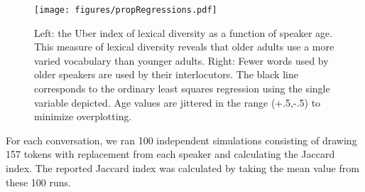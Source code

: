\documentclass[10pt,letterpaper]{article}
\begin{document}
\begin{figure}[t]
\centering
\texttt{[image: figures/propRegressions.pdf]}
\caption{Left: the Uber index of lexical diversity as a function of speaker age. This measure of lexical diversity reveals that older adults use a more varied vocabulary than younger adults. Right:  Fewer words used by older speakers are used by  their interlocutors. The black line corresponds to the ordinary least squares regression using the single variable depicted. Age values are jittered in the range (+.5,-.5) to minimize overplotting.
} 
\label{propRegressions}
\end{figure}

For each conversation, we ran 100 independent simulations consisting of drawing 157 tokens with replacement from each speaker and calculating the Jaccard index. The reported Jaccard index was calculated by taking the mean value from these 100 runs.



\end{document}
